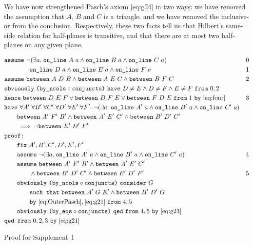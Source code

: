 We have now strengthened Pasch's axiom \eqref{eq:g24} in two ways: we have removed the assumption that $A$, $B$ and $C$ is a triangle, and we have removed the inclusive-or from the conclusion. Respectively, these two facts tell us that Hilbert's same-side relation for half-planes is transitive, and that there are at most two half-planes on any given plane.


\begin{boxedfigure}
  \small
  \begin{align*}
    &\code{assume}\ \Triangle{a}{A}{B}{C} & 0\\
    &\qquad\qquad \code{on\_line}\ D\ a \wedge \code{on\_line}\ E\ a \wedge \code{on\_line}\ F\ a & 1\\
    &\code{assume}\ \between{A}{D}{B} \wedge \between{A}{E}{C} \wedge \between{B}{F}{C} & 2\\
    &\code{obviously}\ \code{(by\_ncols} \circ \code{conjuncts)}\ \code{have}\ D\neq E \wedge D\neq F \wedge E\neq F\ \code{from}\ 0,2\\
    &\code{hence}\ \between{D}{E}{F}\vee\between{D}{F}{E}\vee\between{F}{D}{E}\ \code{from}\ 1\ \code{by} \ \eqref{eq:four}&3\\
    &\code{have}\ \forall A'\;\forall B'\;\forall C'\;\forall D'\;\forall E'\;\forall F'.\; \Triangle{a}{A'}{B'}{C'}\\
    &\qquad \between{A'}{F'}{B'} \wedge \between{A'}{E'}{C'} \wedge \between{B'}{D'}{C'}\\
    &\qquad \implies \neg\between{E'}{D'}{F'}\\ 
    &\code{proof:}\\
    &\qquad \code{fix}\ A',B',C',D',E',F'\\
    &\qquad \code{assume}\ \Triangle{a}{A'}{B'}{C'} & 4\\
    &\qquad \code{assume}\ \between{A'}{F'}{B'} \wedge \between{A'}{E'}{C'}\\ &\qquad\qquad\wedge\between{B'}{D'}{C'}\wedge\between{E'}{D'}{F'} & 5\\
    &\qquad\code{obviously}\ \code{(by\_ncols} \circ \code{conjuncts)}\ \code{consider}\ G\ \\ &\qquad\qquad\code{such that}\ \between{A'}{G}{E'} \wedge \between{B'}{D'}{G}\\ 
    &\qquad\qquad\code{by}\ \eqref{eq:OuterPasch},\eqref{eq:g21}\ \code{from}\ 4,5\\
    &\qquad\code{obviously}\ \code{(by\_eqs} \circ \code{conjuncts)}\  \code{qed}\ \code{from}\ 4,5\ \code{by}\ \eqref{eq:g23}\\
    &\code{qed from}\ 0,2,3\ \code{by}\ \eqref{eq:g21}
  \end{align*}
  \caption{Proof for Supplement~I}
  \label{fig:SupplementIProof}
\end{boxedfigure}
